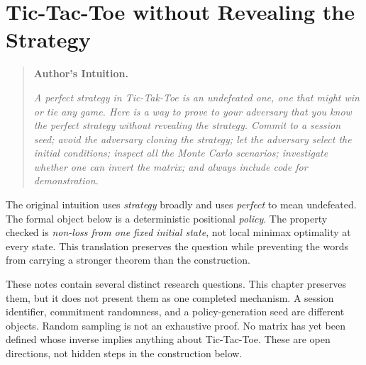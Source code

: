\chapter{Tic-Tac-Toe without Revealing the Strategy}
\label{chap:tic-tac-toe-private-strategy}

\begin{quote}
\textbf{Author's Intuition.}

\emph{A perfect strategy in Tic-Tak-Toe is an undefeated one, one that might
win or tie any game. Here is a way to prove to your adversary that you know the
perfect strategy without revealing the strategy. Commit to a session seed;
avoid the adversary cloning the strategy; let the adversary select the initial
conditions; inspect all the Monte Carlo scenarios; investigate whether one can
invert the matrix; and always include code for demonstration.}
\end{quote}

The original intuition uses \emph{strategy} broadly and uses \emph{perfect} to
mean undefeated. The formal object below is a deterministic positional
\emph{policy}. The property checked is \emph{non-loss from one fixed initial
state}, not local minimax optimality at every state. This translation preserves
the question while preventing the words from carrying a stronger theorem than
the construction.

These notes contain several distinct research questions. This chapter
preserves them, but it does not present them as one completed mechanism. A
session identifier, commitment randomness, and a policy-generation seed are
different objects. Random sampling is not an exhaustive proof. No matrix has
yet been defined whose inverse implies anything about Tic-Tac-Toe. These are
open directions, not hidden steps in the construction below.

\begin{center}
\end{center}

